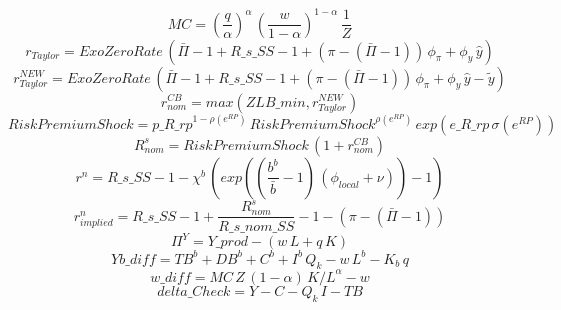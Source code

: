\begin{dmath}
{MC}=\left(\frac{{q}}{{\alpha }}\right)^{{\alpha }}\, \left(\frac{{w}}{1-{\alpha }}\right)^{1-{\alpha }}\, \frac{1}{{Z}}
\end{dmath}
\begin{dmath}
{ r_{Taylor} }={ExoZeroRate}\, \left({ \bar{\Pi} }-1+{R\_s\_SS}-1+\left({ \pi }-\left({ \bar{\Pi} }-1\right)\right)\, {\phi_{\pi}}+{\phi_{y}}\, { \hat{y} }\right)
\end{dmath}
\begin{dmath}
{ r_{Taylor}^{NEW} }={ExoZeroRate}\, \left({ \bar{\Pi} }-1+{R\_s\_SS}-1+\left({ \pi }-\left({ \bar{\Pi} }-1\right)\right)\, {\phi_{\pi}}+{\phi_{y}}\, { \hat{y} - \tilde{y} }\right)
\end{dmath}
\begin{dmath}
{ r^{CB}_{nom}}=max({ZLB\_min},{ r_{Taylor}^{NEW} })
\end{dmath}
\begin{dmath}
{ Risk Premium Shock }={p\_R\_rp}^{1-{\rho(e^{RP}) }}\, { Risk Premium Shock }^{{\rho(e^{RP}) }}\, exp\left({e\_R\_rp}\, {\sigma(e^{RP}) }\right)
\end{dmath}
\begin{dmath}
{ R^s_{nom}}={ Risk Premium Shock }\, \left(1+{ r^{CB}_{nom}}\right)
\end{dmath}
\begin{dmath}
{ r^n }={R\_s\_SS}-1-{\chi^b }\, \left(exp\left(\left(\frac{{b^b}}{{ \bar{b} }}-1\right)\, \left({\phi_{local}}+{\nu }\right)\right)-1\right)
\end{dmath}
\begin{dmath}
{r^n_{implied}}={R\_s\_SS}-1+\frac{{ R^s_{nom}}}{{R\_s\_nom\_SS}}-1-\left({ \pi }-\left({ \bar{\Pi} }-1\right)\right)
\end{dmath}
\begin{dmath}
{\Pi^Y}={Y\_prod}-\left({w}\, {L}+{q}\, {K}\right)
\end{dmath}
\begin{dmath}
{Yb\_diff}={TB^b}+{DB^b}+{C^b}+{I^b}\, { Q_k }-{w}\, {L^b}-{K_b}\, {q}
\end{dmath}
\begin{dmath}
{w\_diff}={MC}\, {Z}\, \left(1-{\alpha }\right)\, {K/L}^{{\alpha }}-{w}
\end{dmath}
\begin{dmath}
{delta\_Check}={Y}-{C}-{ Q_k }\, {I}-{TB}
\end{dmath}
